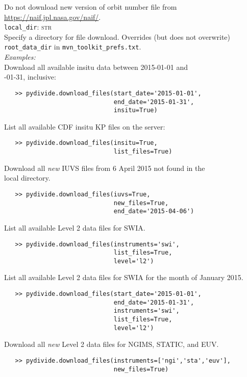 \documentclass{article}
\begin{document}
\indent \indent Do not download new version of orbit number file from \\
\indent \indent \href{https://naif.jpl.nasa.gov/naif/}{https://naif.jpl.nasa.gov/naif/}.\\
\indent \texttt{local\_dir}: \textsc{str}\\
\indent \indent Specify a directory for file download. Overrides (but does not overwrite)\\
\indent \indent \texttt{root\_data\_dir} in \texttt{mvn\_toolkit\_prefs.txt}.\\
\noindent \textit{Examples:}\\
\indent Download all available insitu data between 2015-01-01 and \\
-01-31, inclusive:
\vspace{-5mm}
\begin{verbatim}
   >> pydivide.download_files(start_date='2015-01-01',
                              end_date='2015-01-31',
                              insitu=True)
\end{verbatim}
\indent \indent List all available CDF insitu KP files on the server: \\
\vspace{-10mm}
\begin{verbatim}
   >> pydivide.download_files(insitu=True,
                              list_files=True)
\end{verbatim}
\indent \indent Download all \textit{new} IUVS files from 6 April 2015 not found in the \\
\indent local directory.\\
\vspace{-10mm}
\begin{verbatim}
   >> pydivide.download_files(iuvs=True,
                              new_files=True,
                              end_date='2015-04-06')
\end{verbatim}
\indent \indent List all available Level 2 data files for SWIA.\\
\vspace{-10mm}
\begin{verbatim}
   >> pydivide.download_files(instruments='swi',
                              list_files=True,
                              level='l2')
\end{verbatim}
\indent \indent List all available Level 2 data files for SWIA for the month of January 2015.
\vspace{-10mm}
\begin{verbatim}
   >> pydivide.download_files(start_date='2015-01-01',
                              end_date='2015-01-31',
                              instruments='swi',
                              list_files=True,
                              level='l2')
\end{verbatim}
\indent \indent Download all \textit{new} Level 2 data files for NGIMS, STATIC, and EUV.
\vspace{-5mm}
\begin{verbatim}
   >> pydivide.download_files(instruments=['ngi','sta','euv'],
                              new_files=True)
\end{verbatim}
\end{document}
